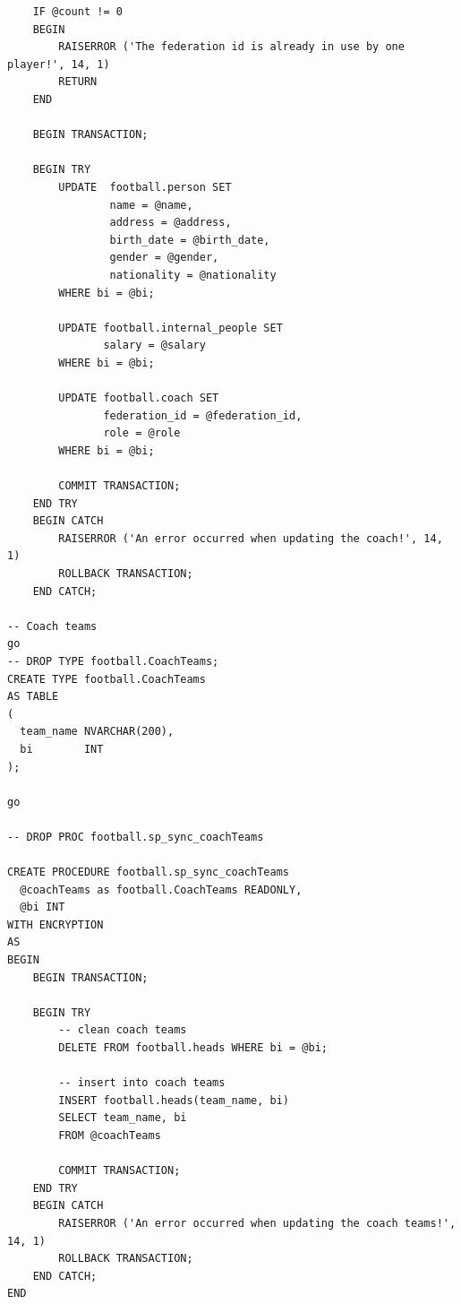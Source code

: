 \documentclass[pdftex,12pt,a4paper]{report}
\begin{document}
\begin{lstlisting}
	IF @count != 0
	BEGIN
		RAISERROR ('The federation id is already in use by one player!', 14, 1)
		RETURN
	END

	BEGIN TRANSACTION;

	BEGIN TRY
		UPDATE  football.person SET
				name = @name, 
				address = @address, 
				birth_date = @birth_date,
				gender = @gender,
				nationality = @nationality
		WHERE bi = @bi;

		UPDATE football.internal_people SET
			   salary = @salary
		WHERE bi = @bi;

		UPDATE football.coach SET
			   federation_id = @federation_id, 
			   role = @role
		WHERE bi = @bi;

		COMMIT TRANSACTION;
	END TRY
	BEGIN CATCH
		RAISERROR ('An error occurred when updating the coach!', 14, 1)
		ROLLBACK TRANSACTION;
	END CATCH;

-- Coach teams
go
-- DROP TYPE football.CoachTeams;
CREATE TYPE football.CoachTeams
AS TABLE
(
  team_name NVARCHAR(200),
  bi		INT
);

go

-- DROP PROC football.sp_sync_coachTeams

CREATE PROCEDURE football.sp_sync_coachTeams
  @coachTeams as football.CoachTeams READONLY,
  @bi INT
WITH ENCRYPTION
AS 
BEGIN
	BEGIN TRANSACTION;

	BEGIN TRY
		-- clean coach teams
		DELETE FROM football.heads WHERE bi = @bi;

		-- insert into coach teams
		INSERT football.heads(team_name, bi)
		SELECT team_name, bi
		FROM @coachTeams
		
		COMMIT TRANSACTION;
	END TRY
	BEGIN CATCH
		RAISERROR ('An error occurred when updating the coach teams!', 14, 1)
		ROLLBACK TRANSACTION;
	END CATCH;
END
\end{lstlisting}
\end{document}

